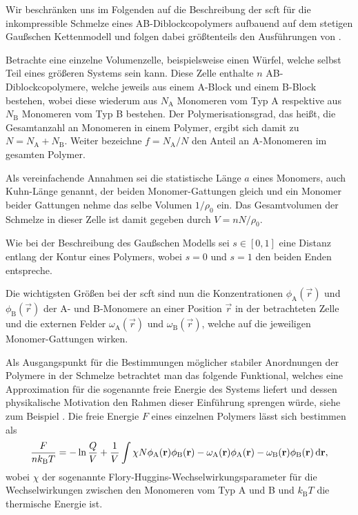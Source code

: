 Wir beschränken uns im Folgenden auf die Beschreibung der \ac{scft} für die inkompressible Schmelze eines AB-Diblockcopolymers aufbauend auf dem stetigen Gaußschen Kettenmodell und folgen dabei größtenteils den Ausführungen von \textcite{Matsen:1994bz,Stasiak:2011ba}.

Betrachte eine einzelne Volumenzelle, beispielsweise einen Würfel, welche selbst Teil eines größeren Systems sein kann.
Diese Zelle enthalte $n$ AB-Diblockcopolymere, welche jeweils aus einem A-Block und einem B-Block bestehen, wobei diese wiederum aus $N_{\mathrm{A}}$ Monomeren vom Typ A respektive aus $N_{\mathrm{B}}$ Monomeren vom Typ B bestehen.
Der Polymerisationsgrad, das heißt, die Gesamtanzahl an Monomeren in einem Polymer, ergibt sich damit zu $N = N_{\mathrm{A}} + N_{\mathrm{B}}$.
Weiter bezeichne $f = N_{\mathrm{A}} / N$ den Anteil an A-Monomeren im gesamten Polymer.

Als vereinfachende Annahmen sei die statistische Länge $a$ eines Monomers, auch Kuhn-Länge genannt, der beiden Monomer-Gattungen gleich und ein Monomer beider Gattungen nehme das selbe Volumen $1 / \rho_{0}$ ein.
Das Gesamtvolumen der Schmelze in dieser Zelle ist damit gegeben durch $V = n N / \rho_{0}$.

Wie bei der Beschreibung des Gaußschen Modells sei $s \in [0, 1]$ eine Distanz entlang der Kontur eines Polymers, wobei $s = 0$ und $s = 1$ den beiden Enden entspreche.

Die wichtigsten Größen bei der \ac{scft} sind nun die Konzentrationen $\phi_{\mathrm{A}}(\vec{r})$ und $\phi_{\mathrm{B}}(\vec{r})$ der A- und B-Monomere an einer Position $\vec{r}$ in der betrachteten Zelle und die externen Felder $\omega_{\mathrm{A}}(\vec{r})$ und $\omega_{\mathrm{B}}(\vec{r})$, welche auf die jeweiligen Monomer-Gattungen wirken.

Als Ausgangspunkt für die Bestimmungen möglicher stabiler Anordnungen der Polymere in der Schmelze betrachtet man das folgende Funktional, welches eine Approximation für die sogenannte freie Energie des Systems liefert und dessen physikalische Motivation den Rahmen dieser Einführung sprengen würde, siehe zum Beispiel \cite{Matsen:2006ud,Fredrickson:2006th}.
Die freie Energie $F$ eines einzelnen Polymers lässt sich bestimmen als
\begin{equation}
\label{eq:el:freie_energie_funktional}
    \frac{F}{nk_{\mathrm{B}}T} = - \ln \frac{Q}{V} + \frac{1}{V} \int \chi N \phi_{\mathrm{A}}(\mathbf{r}) \phi_{\mathrm{B}}(\mathbf{r}) - \omega_{\mathrm{A}}(\mathbf{r}) \phi_{\mathrm{A}}(\mathbf{r}) - \omega_{\mathrm{B}}(\mathbf{r}) \phi_{\mathrm{B}}(\mathbf{r}) \mathop{}\!\mathrm{d} \mathbf{r},
\end{equation}
wobei $\chi$ der sogenannte Flory-Huggins-Wechselwirkungsparameter für die Wechselwirkungen zwischen den Monomeren vom Typ A und B und $k_{\mathrm{B}} T$ die thermische Energie ist.

